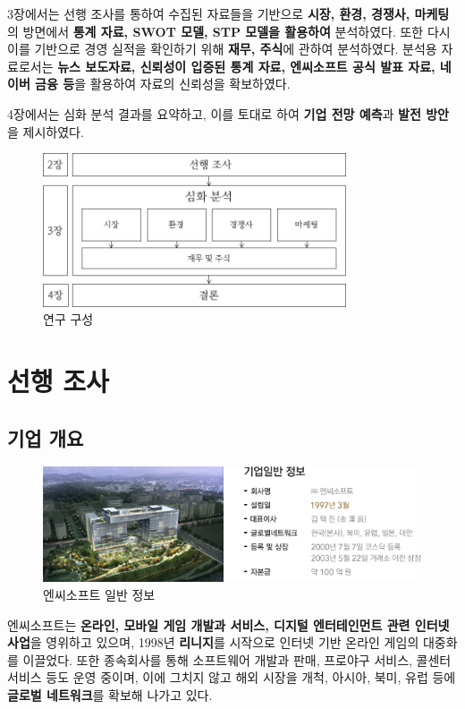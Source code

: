 \documentclass[11pt]{oblivoir}
\begin{document}
			3장에서는 선행 조사를 통하여 수집된 자료들을 기반으로 \textbf{시장, 환경, 경쟁사, 마케팅}의 방면에서 \textbf{통계 자료, SWOT 모델, STP 모델을 활용하여} 분석하였다. 또한 다시 이를 기반으로 경영 실적을 확인하기 위해 \textbf{재무, 주식}에 관하여 분석하였다. 분석용 자료로서는 \textbf{뉴스 보도자료, 신뢰성이 입증된 통계 자료, 엔씨소프트 공식 발표 자료, 네이버 금융 등}을 활용하여 자료의 신뢰성을 확보하였다.
			
			4장에서는 심화 분석 결과를 요약하고, 이를 토대로 하여 \textbf{기업 전망 예측}과 \textbf{발전 방안}을 제시하였다.
			\begin{figure}[htbp]
				\centering
				\includegraphics[width=0.8\textwidth]{Pictures/Methods.png}
				\caption{연구 구성}
			\end{figure}
			
	
	\section{선행 조사}
		\subsection{기업 개요}
		\noindent 
		\begin{figure}[htbp]
			\centering
			\includegraphics[width=1\textwidth]{Pictures/ncinfo.png}
			\caption{엔씨소프트 일반 정보}
		\end{figure} 
		
		엔씨소프트는 \textbf{온라인, 모바일 게임 개발과 서비스, 디지털 엔터테인먼트 관련 인터넷 사업}을 영위하고 있으며, 1998년 \textbf{리니지}를 시작으로 인터넷 기반 온라인 게임의 대중화를 이끌었다. 또한 종속회사를 통해 소프트웨어 개발과 판매, 프로야구 서비스, 콜센터 서비스 등도 운영 중이며, 이에 그치지 않고 해외 시장을 개척, 아시아, 북미, 유럽 등에 \textbf{글로벌 네트워크}를 확보해 나가고 있다.
		
\end{document}
